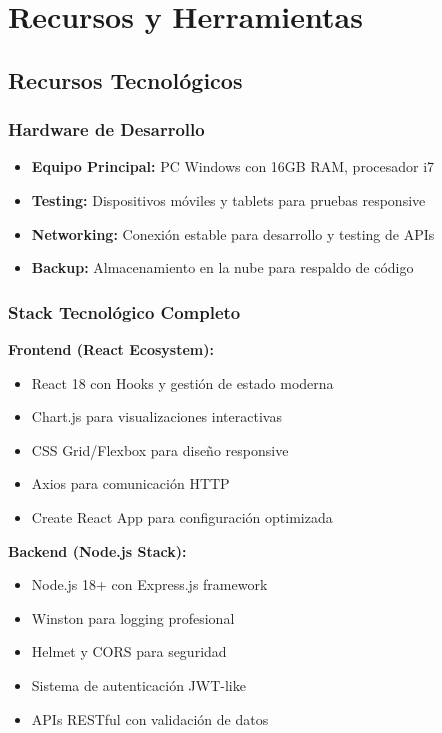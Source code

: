 \documentclass[12pt,a4paper,spanish]{article}
\begin{document}
\section{Recursos y Herramientas}

\subsection{Recursos Tecnológicos}

\subsubsection{Hardware de Desarrollo}
\begin{itemize}
    \item \textbf{Equipo Principal:} PC Windows con 16GB RAM, procesador i7
    \item \textbf{Testing:} Dispositivos móviles y tablets para pruebas responsive
    \item \textbf{Networking:} Conexión estable para desarrollo y testing de APIs
    \item \textbf{Backup:} Almacenamiento en la nube para respaldo de código
\end{itemize}

\subsubsection{Stack Tecnológico Completo}

\textbf{Frontend (React Ecosystem):}
\begin{itemize}
    \item React 18 con Hooks y gestión de estado moderna
    \item Chart.js para visualizaciones interactivas
    \item CSS Grid/Flexbox para diseño responsive
    \item Axios para comunicación HTTP
    \item Create React App para configuración optimizada
\end{itemize}

\textbf{Backend (Node.js Stack):}
\begin{itemize}
    \item Node.js 18+ con Express.js framework
    \item Winston para logging profesional
    \item Helmet y CORS para seguridad
    \item Sistema de autenticación JWT-like
    \item APIs RESTful con validación de datos
\end{itemize}
\end{document}
